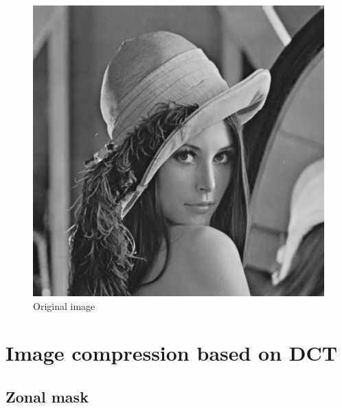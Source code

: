 \bigskip

\pagebreak

\begin{figure}[!htb]\centering
    \includegraphics[width=0.6\linewidth]{./images/7/original.jpg}
    \caption{\small{Original image}}
\end{figure}

\pagebreak

\section{Image compression based on DCT}

\subsection{Zonal mask}

